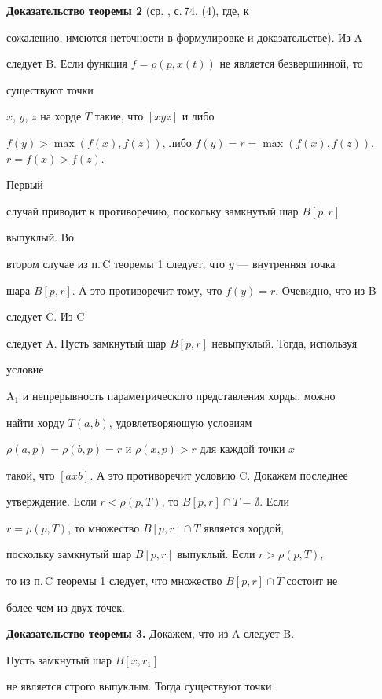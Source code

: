  


{\bf Доказательство теоремы 2} (ср. \cite{1}, с.\,74, (4), где, к 


сожалению, имеются неточности в формулировке и доказательстве). Из A 


следует B. Если функция $f=\rho(p,x(t))$ не является безвершинной, то 


существуют точки 


$x$, $y$, $z$ на хорде $T$ такие, что $[xyz]$ и либо 


$f(y)>\max(f(x),f(z))$, либо $f(y)=r=\max(f(x),f(z))$, $r=f(x)>f(z)$. 


Первый 


случай приводит к противоречию, поскольку замкнутый шар $B[p,r]$ 


выпуклый. Во 


втором случае из п.\,C теоремы 1 следует, что $y$ --- внутренняя точка 


шара $B[p,r]$. А это противоречит тому, что $f(y)=r$. Очевидно, что из B 


следует C. Из C 


следует A. Пусть замкнутый шар $B[p,r]$ невыпуклый. Тогда, используя 


условие 


A${}_1$ и непрерывность параметрического представления хорды, можно 


найти хорду $T(a,b)$, удовлетворяющую условиям 


$\rho(a,p)=\rho(b,p)=r$ и $\rho(x,p)>r$ для каждой точки $x$ 


такой, что $[axb]$. А это противоречит условию C. Докажем последнее 


утверждение. Если $r<\rho(p,T)$, то $B[p,r]\cap T=\emptyset$. Если 


$r=\rho(p,T)$, то множество $B[p,r]\cap T$ является хордой, 


поскольку замкнутый шар $B[p,r]$ выпуклый. Если $r>\rho(p,T)$, 


то из п.\,C теоремы 1 следует, что множество $B[p,r]\cap T$ состоит не 


более чем из двух точек. 


\medskip 


 


{\bf Доказательство теоремы 3.} Докажем, что из A следует B.


Пусть замкнутый шар $B[x,r_1]$ 


не является строго выпуклым. Тогда существуют точки 


